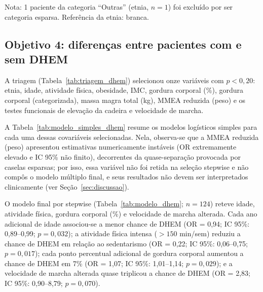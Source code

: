 \documentclass[11pt,a4paper]{article}
\begin{document}
\begin{table}[H]
  \centering
  \caption{Modelo de regressão logística múltipla para fibrose hepática.}
  \label{tab:modelo_fibrose}
  

  \footnotesize
  Nota: 1 paciente da categoria ``Outras'' (etnia, $n = 1$) foi excluído por
  ser categoria esparsa. Referência da etnia: branca.
\end{table}

\subsection{Objetivo 4: diferenças entre pacientes com e sem DHEM}
\label{sec:obj4}

A triagem (Tabela~\ref{tab:triagem_dhem}) selecionou onze variáveis com
$p < 0{,}20$: etnia, idade, atividade física, obesidade, IMC, gordura corporal
(\%), gordura corporal (categorizada), massa magra total (kg), MMEA reduzida
(peso) e os testes funcionais de elevação da cadeira e velocidade de marcha.



A Tabela~\ref{tab:modelo_simples_dhem} resume os modelos logísticos simples para
cada uma dessas covariáveis selecionadas. Nela, observa-se que a MMEA reduzida
(peso) apresentou estimativas numericamente instáveis (OR extremamente elevado e
IC 95\% não finito), decorrentes da quase-separação provocada por caselas
esparsas; por isso, essa variável não foi retida na seleção stepwise e não
compôs o modelo múltiplo final, e seus resultados não devem ser interpretados
clinicamente (ver Seção~\ref{sec:discussao}).

\begin{table}[H]
  \centering
  \caption{Modelos logísticos simples para DHEM.}
  \label{tab:modelo_simples_dhem}
  
\end{table}

O modelo final por stepwise (Tabela~\ref{tab:modelo_dhem}; $n = 124$) reteve
idade, atividade física, gordura corporal (\%) e velocidade de marcha alterada.
Cada ano adicional de idade associou-se a menor chance de DHEM (OR = 0,94;
IC 95\%: 0,89--0,99; $p = 0{,}032$); a atividade física intensa
($> 150$ min/sem) reduziu a chance de DHEM em relação ao sedentarismo
(OR = 0,22; IC 95\%: 0,06--0,75; $p = 0{,}017$); cada ponto percentual adicional
de gordura corporal aumentou a chance de DHEM em 7\% (OR = 1,07;
IC 95\%: 1,01--1,14; $p = 0{,}029$); e a velocidade de marcha alterada quase
triplicou a chance de DHEM (OR = 2,83; IC 95\%: 0,90--8,79; $p = 0{,}070$).
\end{document}
